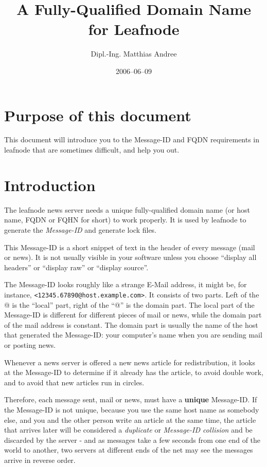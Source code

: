 \documentclass[10pt,english,a5paper]{article}
\begin{document}
\author{Dipl.-Ing. Matthias Andree}
\title{A Fully-Qualified Domain Name \\ for Leafnode}
\date{2006--06--09}
\maketitle
\tableofcontents

\section*{Purpose of this document}

This document will introduce you to the Message-ID and FQDN requirements
in leafnode that are sometimes difficult, and help you out.

\section{Introduction}

The leafnode news server needs a unique fully-qualified domain name (or
host name, FQDN or FQHN for short) to work properly. It is used by
leafnode to generate the \emph{Message-ID} and generate lock files.

This Message-ID is a short snippet of text in the header of
every message (mail or news). It is not usually visible in your software
unless you choose ``display all headers'' or ``display raw'' or ``display
source''.

The Message-ID looks roughly like a strange E-Mail address,
it might be, for instance, \verb+<12345.67890@host.example.com>+.  It consists of two
parts. Left of the @ is the ``local'' part, right of the ``@'' is the domain
part. The local part of the Message-ID is different for different pieces
of mail or news, while the domain part of the mail address is constant.
The domain part is usually the name of the host that generated the
Message-ID: your computer's name when you are sending mail or posting
news.

Whenever a news server is offered a new news article for redistribution,
it looks at the Message-ID to determine if it already has the article,
to avoid double work, and to avoid that new articles run in circles.

Therefore, each message sent, mail or news, must have a \textbf{unique}
Message-ID\@. If the Message-ID is not unique, because you use the same
host name as somebody else, and you and the other person write an
article at the same time, the article that arrives later will be
considered a \textit{duplicate} or \textit{Message-ID collision} and be discarded by
the server - and as messages take a few seconds from one end of the
world to another, two servers at different ends of the net may see the
messages arrive in reverse order.
\end{document}

